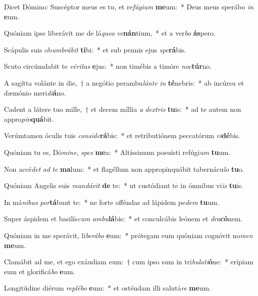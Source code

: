 \item Dicet Dómino: Suscéptor meus es tu, et re\textit{fú}\textit{gi}\textit{um} \textbf{me}um:~* Deus meus sperábo \textit{in} \textbf{e}um.
\item Quóniam ipse liberávit me de lá\textit{que}\textit{o} \textit{ve}\textbf{nán}tium,~* et a ver\textit{bo} \textbf{ás}pero.
\item Scápulis suis ob\textit{um}\textit{brá}\textit{bit} \textbf{ti}bi:~* et sub pennis ejus \textit{spe}\textbf{rá}bis.
\item Scuto circúmdabit te \textit{vé}\textit{ri}\textit{tas} \textbf{e}jus:~* non timébis a timóre \textit{noc}\textbf{túr}no.
\item A sagítta volánte in die,~† a negótio perambu\textit{lán}\textit{te} \textit{in} \textbf{té}nebris:~* ab incúrsu et dæmónio meri\textit{di}\textbf{á}no.
\item Cadent a látere tuo mille,~† et decem míllia \textit{a} \textit{dex}\textit{tris} \textbf{tu}is:~* ad te autem non appro\textit{pin}\textbf{quá}bit.
\item Verúmtamen óculis tuis \textit{con}\textit{si}\textit{de}\textbf{rá}bis:~* et retributiónem peccatórum \textit{vi}\textbf{dé}bis.
\item Quóniam tu es, Dó\textit{mi}\textit{ne}, \textit{spes} \textbf{me}a:~* Altíssimum posuísti refúgi\textit{um} \textbf{tu}um.
\item Non accé\textit{det} \textit{ad} \textit{te} \textbf{ma}lum:~* et flagéllum non appropinquábit tabernácu\textit{lo} \textbf{tu}o.
\item Quóniam Angelis suis \textit{man}\textit{dá}\textit{vit} \textbf{de} te:~* ut custódiant te in ómnibus vi\textit{is} \textbf{tu}is.
\item In má\textit{ni}\textit{bus} \textit{por}\textbf{tá}bunt te:~* ne forte offéndas ad lápidem pe\textit{dem} \textbf{tu}um.
\item Super áspidem et basilís\textit{cum} \textit{am}\textit{bu}\textbf{lá}bis:~* et conculcábis leónem et \textit{dra}\textbf{có}nem.
\item Quóniam in me sperávit, li\textit{be}\textit{rá}\textit{bo} \textbf{e}um:~* prótegam eum quóniam cognóvit no\textit{men} \textbf{me}um.
\item Clamábit ad me, et ego exáudiam eum:~† cum ipso sum in tri\textit{bu}\textit{la}\textit{ti}\textbf{ó}ne:~* erípiam eum et glorificá\textit{bo} \textbf{e}um.
\item Longitúdine diérum \textit{re}\textit{plé}\textit{bo} \textbf{e}um:~* et osténdam illi salutá\textit{re} \textbf{me}um.
